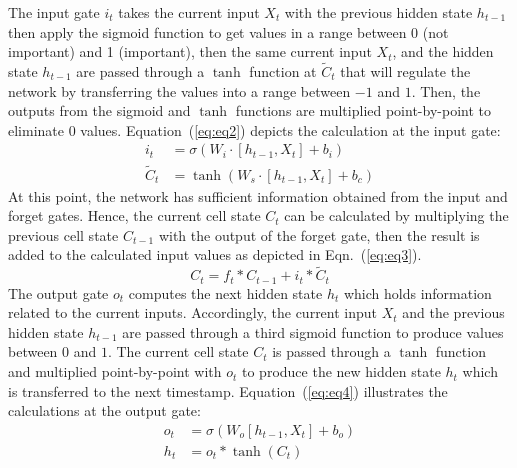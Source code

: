The input gate \(i_{t}\) takes the current input \(X_t\) with the previous hidden state \(h_{t-1}\) then apply the sigmoid function to get values in a range between 0 (not important) and 1 (important), then the
same current input \(X_t\), and the hidden state \(h_{t-1}\) are passed through a \(\tanh\) function at \(\tilde{C}_{t}\) that will regulate the network by transferring the values into a range between \(-1\) and \(1\).
Then, the outputs from the sigmoid and \(\tanh\) functions are multiplied point-by-point to eliminate \(0\) values.  
Equation~(\ref{eq:eq2}) depicts the calculation at the input gate:
\begin{equation}
	\begin{aligned}
		i_{t} &=\sigma\left(W_{i} \cdot\left[h_{t-1}, X_{t}\right]+b_{i}\right) 
		\\
		\tilde{C}_{t} &=\tanh \left(W_{s} \cdot\left[h_{t-1}, X_{t}\right]+b_{c}\right) 
	\end{aligned} \label{eq:eq2}
\end{equation}
At this point, the network has sufficient information obtained from the input and forget gates. 
Hence, the current cell state \(C_t\) can be calculated by multiplying the previous cell state \(C_{t-1}\) with the output of the forget gate, then the result is added to the calculated input values as depicted in Eqn.~(\ref{eq:eq3}).
\begin{equation}
	C_{t}=f_{t} * C_{t-1}+i_{t} * \tilde{C}_{t}
	\label{eq:eq3}
\end{equation}
The output gate \(o_{t}\) computes the next hidden state \(h_{t}\) which
holds information related to the current inputs. 
Accordingly, the current input \(X_{t}\) and the previous hidden state \(h_{t-1}\) are passed through a third sigmoid function to produce values between \(0\) and \(1\).
The current cell state \(C_{t}\) is passed through a \(\tanh\) function and multiplied point-by-point with \(o_{t}\) to produce the new hidden state \(h_{t}\) which is transferred to the next timestamp.
Equation~(\ref{eq:eq4}) illustrates the calculations at the output gate:
\begin{equation}
	\begin{aligned}
		o_{t} &=\sigma\left(W_{o}\left[h_{t-1}, X_{t}\right]+b_{o}\right) \\
		h_{t} &=o_{t} * \tanh \left(C_{t}\right)
	\end{aligned}
	\label{eq:eq4}
\end{equation} 

